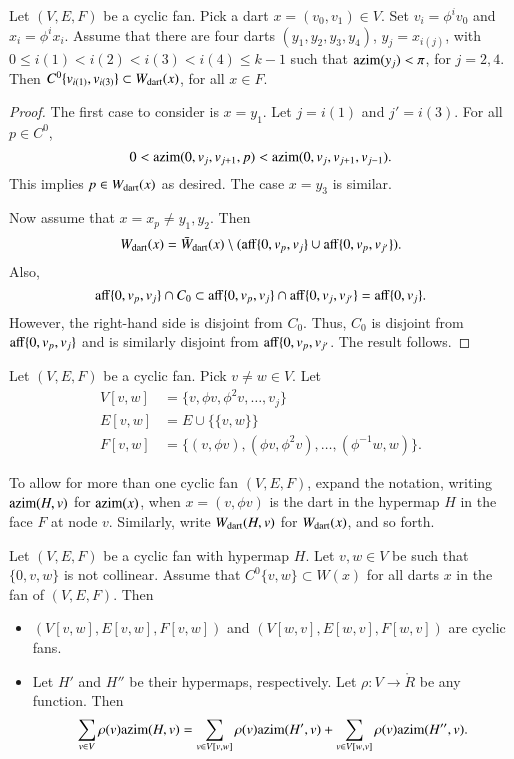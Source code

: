 \begin{lemma}  Let $(V,E,F)$ be a cyclic fan.  Pick a dart $x=(v_0,v_1)\in V$.  Set $v_i = \phi^i v_0$ and $x_i = \phi^i x_i$.  Assume that there are four darts $(y_1,y_2,y_3,y_4)$, $y_j = x_{i(j)}$, with
$0\le i(1) < i(2) < i(3) < i(4)\le k-1$ 
such that ${\operatorname{azim}}(y_j) < \pi$, for $j=2,4$.  
Then $C^0\{v_{i(1)},v_{i(3)}\} \subset W_{\text{dart}}(x)$, for all $x\in F$.
\end{lemma}

\begin{proof} The first case to consider is $x=y_1$.  Let $j=i(1)$ and $j' = i(3)$. For all $p\in C^0$, 
$$
0 < {\operatorname{azim}}(0,v_{j},v_{j+1},p) < {\operatorname{azim}}(0,v_j,v_{j+1},v_{j-1}).
$$  
This implies $p\in W_{\text{dart}}(x)$ as desired.  The case $x=y_3$ is similar.

Now assume that $x=x_p\ne y_1,y_2$.  Then
$$
W_{\text{dart}}(x) = \bar W_{\text{dart}}(x)\setminus ({\operatorname{aff}}\{0,v_p,v_j\}\cup{\operatorname{aff}}\{0,v_p,v_{j'}\}).
$$
Also, 
$$
{\operatorname{aff}}\{0,v_p,v_j\}\cap C_0 \subset {\operatorname{aff}}\{0,v_p,v_j\}\cap {\operatorname{aff}}\{0,v_j,v_{j'}\} = {\operatorname{aff}}\{0,v_j\}.
$$
However, the right-hand side is disjoint from $C_0$.  Thus, $C_0$ is disjoint from ${\operatorname{aff}}\{0,v_p,v_j\}$ and is similarly disjoint from ${\operatorname{aff}}\{0,v_p,v_{j'}$.  The result follows.
\end{proof}

\begin{definition} Let $(V,E,F)$ be a cyclic fan.  Pick $v\ne w\in V$.
Let
$$
\begin{array}{lll}
V[v,w] &= \{v,\phi v,\phi^2 v,\ldots,v_j\}\\
E[v,w] &= E \cup \{\{v,w\}\}\\
F[v,w] &= \{(v,\phi v),(\phi v,\phi^2 v),\ldots,(\phi^{-1}w,w)\}.
\end{array}
$$
\end{definition}

To allow for more than one cyclic fan $(V,E,F)$,  expand the notation, writing ${\operatorname{azim}}(H,v)$ for ${\operatorname{azim}}(x)$, when $x=(v,\phi v)$ is the dart in the hypermap $H$ in the face $F$ at node $v$.  Similarly, write $W_{\text{dart}}(H,v)$ for $W_{\text{dart}}(x)$, and so forth.


\begin{lemma}  Let $(V,E,F)$ be a cyclic fan with hypermap $H$.  Let $v,w\in V$ be such that $\{0,v,w\}$ is not collinear.  Assume that $C^0\{v,w\}\subset W(x)$ for all darts $x$ in the fan of $(V,E,F)$. Then
\begin{itemize}
\item $(V[v,w],E[v,w],F[v,w])$ and $(V[w,v],E[w,v],F[w,v])$ are cyclic fans.  
\item Let $H'$ and $H''$ be their hypermaps, respectively.  Let $\rho:V\to\ring{R}$ be any function.  Then
$$
\sum_{v\in V} \rho(v){\operatorname{azim}}(H,v) = \sum_{v\in V[v,w]}\rho(v){\operatorname{azim}}(H',v) + \sum_{v\in V[w,v]}\rho(v){\operatorname{azim}}(H'',v).
$$
\end{itemize}
\end{lemma}

